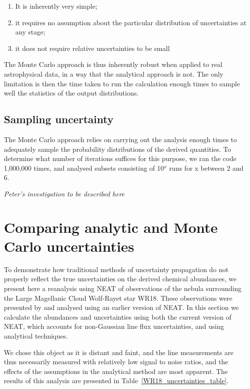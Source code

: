 \documentclass[useAMS,usenatbib]{mn2e}
\begin{document}
\begin{enumerate}
  \item It is inherently very simple;
  \item it requires no assumption about the particular distribution of uncertainties at any stage;
  \item it does not require relative uncertainties to be small
\end{enumerate}

The Monte Carlo approach is thus inherently robust when applied to real astrophysical data, in a way that the analytical approach is not.  The only limitation is then the time taken to run the calculation enough times to sample well the statistics of the output distributions.

\subsection{Sampling uncertainty}

The Monte Carlo approach relies on carrying out the analysis enough times to adequately sample the probability distributions of the derived quantities.  To determine what number of iterations suffices for this purpose, we ran the code 1,000,000 times, and analysed subsets consisting of 10$^x$ runs for x between 2 and 6.

{\it Peter's investigation to be described here}

\section{Comparing analytic and Monte Carlo uncertainties}

To demonstrate how traditional methods of uncertainty propagation do not properly reflect the true uncertainties on the derived chemical abundances, we present here a reanalysis using NEAT of observations of the nebula surrounding the Large Magellanic Cloud Wolf-Rayet star WR18.  These observations were presented by \citet{2011MNRAS.tmp.1754S} and analysed using an earlier version of NEAT.  In this section we calculate the abundances and uncertainties using both the current version of NEAT, which accounts for non-Gaussian line flux uncertainties, and using analytical techniques.

We chose this object as it is distant and faint, and the line measurements are thus necessarily measured with relatively low signal to noise ratios, and the effects of the assumptions in the analytical method are most apparent.  The results of this analysis are presented in Table~\ref{WR18_uncertainties_table}.
\end{document}
